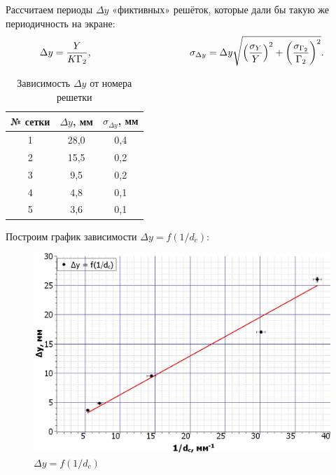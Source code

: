 \documentclass[a4paper,12pt]{article} %
\begin{document}
	\newpage

	Рассчитаем периоды $\Delta y$ «фиктивных» решёток, которые дали бы такую же периодичность на экране:
	\begin{equation*}
		\Delta y = \frac{Y}{K\Gamma_2}, \hspace{35mm} \sigma_{\Delta y} = \Delta y \sqrt{\left(\frac{\sigma_Y}{Y}\right)^2 + \left(\frac{\sigma_{\Gamma_2}}{\Gamma_2}\right)^2}.
	\end{equation*}

	\begin{table}[h!]
		\centering
		\begin{tabular}{|c|c|c|}
			\hline
			№ сетки & $\Delta y$, мм & $\sigma_{\Delta y}$, мм \\ \hline
			1       & 28,0           & 0,4                     \\ \hline
			2       & 15,5           & 0,2                     \\ \hline
			3       & 9,5            & 0,2                     \\ \hline
			4       & 4,8            & 0,1                     \\ \hline
			5       & 3,6            & 0,1                     \\ \hline
		\end{tabular}
	\caption{Зависимость $\Delta y$ от номера решетки}
	\end{table}

	Построим график зависимости $\Delta y = f(1/d_c)$:
	
	\begin{figure}[h!]
		\centering
		\includegraphics[scale=0.6]{Pictures/Dy}
		\caption{$\Delta y = f(1/d_c)$}
	\end{figure}
\end{document}
